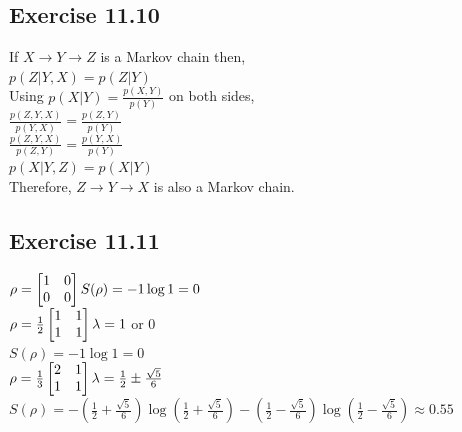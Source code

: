 \documentclass[a4paper,12pt]{article}
\begin{document}
\subsection*{Exercise 11.10}
If $X\rightarrow Y\rightarrow Z$ is a Markov chain then,\\
$p(Z|Y,X)=p(Z|Y)$\\
Using $p(X|Y)=\frac{p(X,Y)}{p(Y)}$ on both sides,\\
$\displaystyle\frac{p(Z,Y,X)}{p(Y,X)}=\frac{p(Z,Y)}{p(Y)}$\\
$\displaystyle\frac{p(Z,Y,X)}{p(Z,Y)}=\frac{p(Y,X)}{p(Y)}$\\
$p(X|Y,Z)=p(X|Y)$\\
Therefore, $Z\rightarrow Y\rightarrow X$ is also a Markov chain.
\subsection*{Exercise 11.11}
$\rho=\begin{bmatrix}
    1&0\\
    0&0
\end{bmatrix}\\
S(\rho)=-1\log{1}=0$\\
$\rho=\frac{1}{2}\begin{bmatrix}
    1&1\\
    1&1
\end{bmatrix}\\
\lambda= 1$ or $0$\\
$S(\rho)=-1\log{1}=0$\\
$\rho=\frac{1}{3}\begin{bmatrix}
    2&1\\
    1&1
\end{bmatrix}\\
\lambda= \frac{1}{2}\pm\frac{\sqrt{5}}{6}$\\
$S(\rho)=-(\frac{1}{2}+\frac{\sqrt{5}}{6})\log{(\frac{1}{2}+\frac{\sqrt{5}}{6})}
-(\frac{1}{2}-\frac{\sqrt{5}}{6})\log{(\frac{1}{2}-\frac{\sqrt{5}}{6})}\approx 0.55$\\
\end{document}
